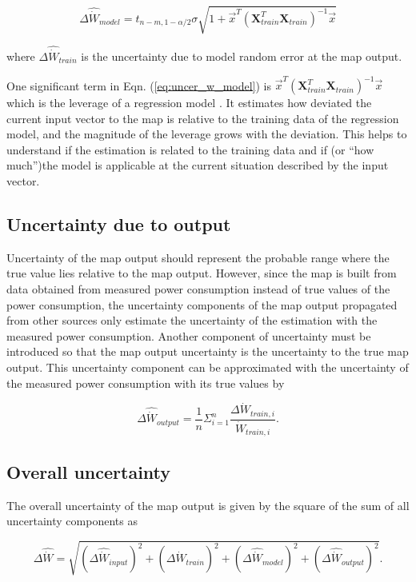 \begin{equation}
\Delta {\hat{\dot{W}}_{model}} = {t_{n - m,1 - \alpha /2}}\sigma \sqrt {1 + {{\vec x}^T}{{({\mathbf{X}}_{train}^T{{\mathbf{X}}_{train}})}^{ - 1}}\vec x}
\label{eq:uncer_w_model}
\end{equation}

where $\Delta {\hat{\dot{W}}_{train}}$ is the uncertainty due to model random error at the map output.

One significant term in Eqn. (\ref{eq:uncer_w_model}) is ${\vec x^T}{({\mathbf{X}}_{train}^T{{\mathbf{X}}_{train}})^{ - 1}}\vec x$ which is the leverage of a regression model \cite{Atkinson:1987}. It estimates how deviated the current input vector to the map is relative to the training data of the regression model, and the magnitude of the leverage grows with the deviation. This helps to understand if the estimation is related to the training data and if (or ``how much'')the model is applicable at the current situation described by the input vector.

\subsection{Uncertainty due to output} \label{subsec:uncer_output}

Uncertainty of the map output should represent the probable range where the true value lies relative to the map output. However, since the map is built from data obtained from measured power consumption instead of true values of the power consumption, the uncertainty components of the map output propagated from other sources only estimate the uncertainty of the estimation with the measured power consumption. Another component of uncertainty must be introduced so that the map output uncertainty is the uncertainty to the true map output. This uncertainty component can be approximated with the uncertainty of the measured power consumption with its true values by

\begin{equation}
\Delta {\hat{\dot{W}}_{output}} = \frac{1}{n}\Sigma _{i = 1}^n\frac{{\Delta {{\dot{W}}_{train,i}}}}{{{{\dot{W}}_{train,i}}}} .
\label{eq:uncer_w_output}
\end{equation}

\subsection{Overall uncertainty} \label{subsec:overall_uncer}

The overall uncertainty of the map output is given by the square of the sum of all uncertainty components as

\begin{equation}
\Delta \hat{\dot{W}}= \sqrt {{{(\Delta {{\hat{\dot{W}}}_{input}})}^2} + {{(\Delta {{\hat{\dot{W}}}_{train}})}^2} + {{(\Delta {{\hat{\dot{W}}}_{model}})}^2} + {{(\Delta {{\hat{\dot{W}}}_{output}})}^2}} .
\label{eq:overall_uncer}
\end{equation}
